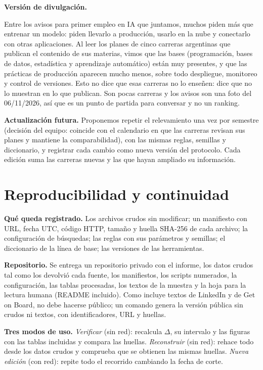 \documentclass[11pt,a4paper]{article}
\begin{document}
\textbf{Versión de divulgación.}
\begin{caja}
Entre los avisos para primer empleo en IA que juntamos, muchos piden más que entrenar un modelo: piden llevarlo a producción, usarlo en la nube y conectarlo con otras aplicaciones. Al leer los planes de cinco carreras argentinas que publican el contenido de sus materias, vimos que las bases (programación, bases de datos, estadística y aprendizaje automático) están muy presentes, y que las prácticas de producción aparecen mucho menos, sobre todo despliegue, monitoreo y control de versiones. Esto no dice que esas carreras no lo enseñen: dice que no lo muestran en lo que publican. Son pocas carreras y los avisos son una foto del 06/11/2026, así que es un punto de partida para conversar y no un ranking.
\end{caja}

\textbf{Actualización futura.} Proponemos repetir el relevamiento una vez por semestre (decisión del equipo: coincide con el calendario en que las carreras revisan sus planes y mantiene la comparabilidad), con las mismas reglas, semillas y diccionario, y registrar cada cambio como nueva versión del protocolo. Cada edición suma las carreras nuevas y las que hayan ampliado su información.

\section{Reproducibilidad y continuidad}\label{sec:repro}
\textbf{Qué queda registrado.} Los archivos crudos sin modificar; un manifiesto con URL, fecha UTC, código HTTP, tamaño y huella SHA-256 de cada archivo; la configuración de búsquedas; las reglas con sus parámetros y semillas; el diccionario de la línea de base; las versiones de las herramientas.

\textbf{Repositorio.} Se entrega un repositorio privado con el informe, los datos crudos tal como los devolvió cada fuente, los manifiestos, los scripts numerados, la configuración, las tablas procesadas, los textos de la muestra y la hoja para la lectura humana (README incluido). Como incluye textos de LinkedIn y de Get on Board, no debe hacerse público; un comando genera la versión pública sin crudos ni textos, con identificadores, URL y huellas.

\textbf{Tres modos de uso.} \emph{Verificar} (sin red): recalcula $\Delta$, su intervalo y las figuras con las tablas incluidas y compara las huellas. \emph{Reconstruir} (sin red): rehace todo desde los datos crudos y comprueba que se obtienen las mismas huellas. \emph{Nueva edición} (con red): repite todo el recorrido cambiando la fecha de corte.
\end{document}
